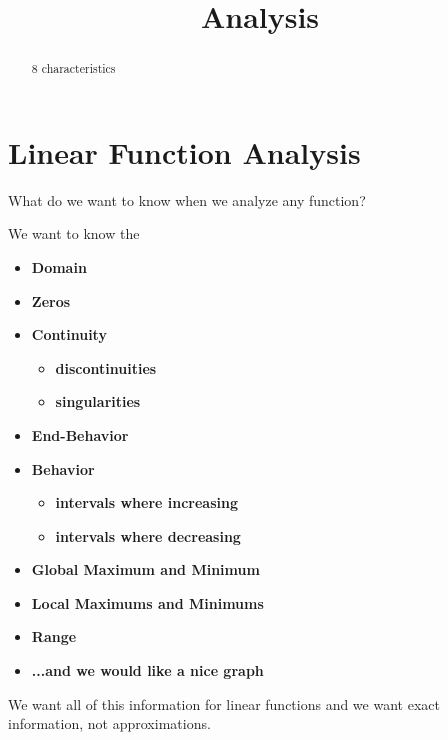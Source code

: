 \documentclass{ximera}
\title{Analysis}
\begin{document}
\begin{abstract}
8 characteristics
\end{abstract}
\maketitle





\section*{Linear Function Analysis}

What do we want to know when we analyze any function?

We want to know the 
\begin{itemize}
     \item \textbf{\textcolor{red!70!black}{Domain}} 
     \item \textbf{\textcolor{red!70!black}{Zeros}} 
     \item \textbf{\textcolor{red!70!black}{Continuity}} 
\begin{itemize}
     \item \textbf{\textcolor{purple!85!blue}{discontinuities}} 
     \item \textbf{\textcolor{purple!85!blue}{singularities}} 
\end{itemize}
     \item \textbf{\textcolor{red!70!black}{End-Behavior}} 
     \item \textbf{\textcolor{red!70!black}{Behavior}} 
\begin{itemize}
     \item \textbf{\textcolor{purple!85!blue}{intervals where increasing}} 
     \item \textbf{\textcolor{purple!85!blue}{intervals where decreasing}} 
\end{itemize}
     \item \textbf{\textcolor{red!70!black}{Global Maximum and Minimum}} 
     \item \textbf{\textcolor{red!70!black}{Local Maximums and Minimums}} 
     \item \textbf{\textcolor{red!70!black}{Range}} 
     \item \textbf{\textcolor{blue!55!black}{...and we would like a nice graph}} 
\end{itemize}

We want all of this information for linear functions and we want exact information, not approximations. \\
\end{document}
